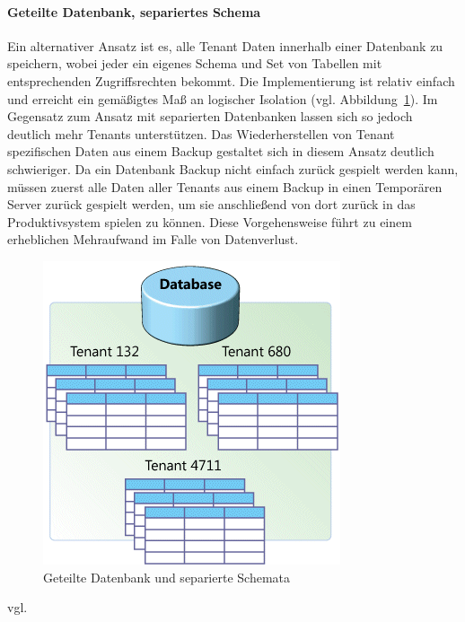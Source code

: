 \paragraph{Geteilte Datenbank, separiertes Schema}
Ein alternativer Ansatz ist es, alle Tenant Daten innerhalb einer Datenbank zu speichern, wobei jeder ein eigenes Schema und Set von Tabellen mit entsprechenden Zugriffsrechten bekommt.
Die Implementierung ist relativ einfach und erreicht ein gemäßigtes Maß an logischer Isolation (vgl. Abbildung~\ref{fig:geteilteDatenbank}). Im Gegensatz zum Ansatz mit separierten Datenbanken lassen sich so jedoch deutlich mehr Tenants unterstützen. Das Wiederherstellen von Tenant spezifischen Daten aus einem Backup gestaltet sich in diesem Ansatz deutlich schwieriger. Da ein Datenbank Backup nicht einfach zurück gespielt werden kann, müssen zuerst alle Daten aller Tenants aus einem Backup in einen Temporären Server zurück gespielt werden, um sie anschließend von dort zurück in das Produktivsystem spielen zu können. Diese Vorgehensweise führt zu einem erheblichen Mehraufwand im Falle von Datenverlust.

\begin{figure}[h]
	\centering
	\includegraphics[width=0.5\linewidth]{images/geteilte_datenbanken-separiertes_schema}
	\caption{Geteilte Datenbank und separierte Schemata}
	\label{fig:geteilteDatenbank}
\end{figure}
vgl.
\\
\\
